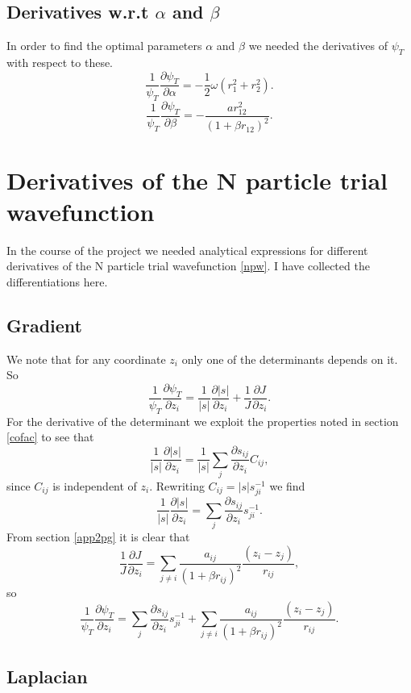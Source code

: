 \documentclass[a4paper,English,10pt]{article}
\newcommand{\p}{\partial}
\newcommand{\pddt}[2]{\frac{\p #1}{\p #2}}
\newcommand{\f}{\frac}
\begin{document}
\subsection{Derivatives w.r.t \(\alpha\) and \(\beta\)} \label{app2pab}
In order to find the optimal parameters \(\alpha\) and \(\beta\) we needed the derivatives of \(\psi_T\) with respect to these.
\[  \f{1}{\psi_T}\pddt{\psi_T}{\alpha} = -\f{1}{2}\omega(r_1^2 + r_2^2).\]
\[  \f{1}{\psi_T}\pddt{\psi_T}{\beta} = -\f{ar_{12}^2}{(1+\beta r_{12})^2}.\]

\section{Derivatives of the N particle trial wavefunction}
In the course of the project we needed analytical expressions for different derivatives of the N particle trial wavefunction \ref{npw}. I have collected
the differentiations here.

\subsection{Gradient}\label{appgradn}
We note that for any coordinate $z_i$ only one of the determinants depends on it. So
\[
\frac{1}{\psi_T}\pddt{\psi_T}{z_i} = \f{1}{|s|}\pddt{|s|}{z_i} + \f{1}{J}\pddt{J}{z_i}.
\]
For the derivative of the determinant we exploit the properties noted in section \ref{cofac} to see that
\[
\f{1}{|s|}\pddt{|s|}{z_i} = \f{1}{|s|}\sum_j\pddt{s_{ij}}{z_i}C_{ij},
\]
since $C_{ij}$ is independent of $z_i$. Rewriting $C_{ij} = |s|s^{-1}_{ji}$ we find
\[
\f{1}{|s|}\pddt{|s|}{z_i} = \sum_j\pddt{s_{ij}}{z_i}s^{-1}_{ji}.
\]
From section \ref{app2pg} it is clear that
\[
\f{1}{J}\pddt{J}{z_i} = \sum_{j\neq i}\f{a_{ij}}{(1+\beta r_{ij})^2}\f{(z_i-z_j)}{r_{ij}},
\]
so
\[
\frac{1}{\psi_T}\pddt{\psi_T}{z_i} = \sum_j\pddt{s_{ij}}{z_i}s^{-1}_{ji} + \sum_{j\neq i}\f{a_{ij}}{(1+\beta r_{ij})^2}\f{(z_i-z_j)}{r_{ij}} .
\]


\subsection{Laplacian}\label{applapn}
\end{document}
